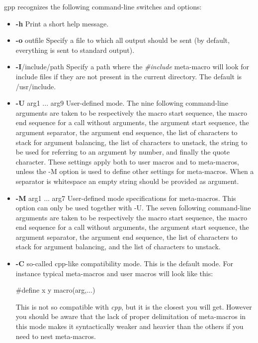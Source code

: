 gpp recognizes the following command-line switches and options: 

\begin{itemize}
\item {\bf -h}\htmlBR
Print a short help message. 

\item {\bf -o} outfile\htmlBR
Specify a file to which all output should be sent (by default, everything is
sent to standard output). 

\item {\bf -I}/include/path\htmlBR
Specify a path where the {\it \#include} meta-macro will look for include
files if they are not present in the current directory. The default is
/usr/include. 

\item {\bf -U} arg1 ... arg9\htmlBR
User-defined mode. The nine following command-line arguments are taken to be
respectively the macro start sequence, the macro end sequence for a call
without arguments, the argument start sequence, the argument separator, the
argument end sequence, the list of characters to stack for argument balancing,
the list of characters to unstack, the string to be used for referring to an
argument by number, and finally the quote character. These settings apply both
to user macros and to meta-macros, unless the -M option is used to define
other settings for meta-macros. When a separator is whitespace an empty string
should be provided as argument. 

\item {\bf -M} arg1 ... arg7\htmlBR
User-defined mode specifications for meta-macros. This option can only be used
together with -U. The seven following command-line arguments are taken to be
respectively the macro start sequence, the macro end sequence for a call
without arguments, the argument start sequence, the argument separator, the
argument end sequence, the list of characters to stack for argument balancing,
and the list of characters to unstack. 

\item {\bf -C}\htmlBR
so-called cpp-like compatibility mode. This is the default mode. For instance
typical meta-macros and user macros will look like this: 

\begin{PRE}
\#define x y
macro(arg,...)
\end{PRE}

This is not so compatible with {\it cpp}, but it is the closest you will get.
However you should be aware that the lack of proper delimitation of
meta-macros in this mode makes it syntactically weaker and heavier than the
others if you need to nest meta-macros. 


\end{itemize}
